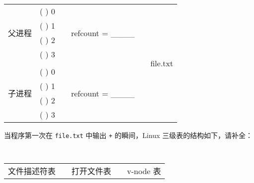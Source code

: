 \begin{problems}
\begin{table}[H]
\begin{tabular}{cccccc}
                \multicolumn{1}{|c|}{\multirow{4}{*}{父进程}} & \multicolumn{1}{c|}{(     ) 0} & \multicolumn{1}{c|}{} & \multicolumn{1}{c|}{\multirow{4}{*}{refcount = \_\_\_\_}} & \multicolumn{1}{c|}{} & \multicolumn{1}{c|}{\multirow{9}{*}{file.txt}} \\ \cline{2-2}
                \multicolumn{1}{|c|}{} & \multicolumn{1}{c|}{(     ) 1} & \multicolumn{1}{c|}{} & \multicolumn{1}{c|}{} & \multicolumn{1}{c|}{} & \multicolumn{1}{c|}{} \\ \cline{2-2}
                \multicolumn{1}{|c|}{} & \multicolumn{1}{c|}{(     ) 2} & \multicolumn{1}{c|}{} & \multicolumn{1}{c|}{} & \multicolumn{1}{c|}{} & \multicolumn{1}{c|}{} \\ \cline{2-2}
                \multicolumn{1}{|c|}{} & \multicolumn{1}{c|}{(     ) 3} & \multicolumn{1}{c|}{} & \multicolumn{1}{c|}{} & \multicolumn{1}{c|}{} & \multicolumn{1}{c|}{} \\ \cline{1-2} \cline{4-4}
                &  &  &  & \multicolumn{1}{c|}{} & \multicolumn{1}{c|}{} \\ \cline{1-2} \cline{4-4}
                \multicolumn{1}{|c|}{\multirow{4}{*}{子进程}} & \multicolumn{1}{c|}{(     ) 0} & \multicolumn{1}{c|}{} & \multicolumn{1}{c|}{\multirow{4}{*}{refcount = \_\_\_\_}} & \multicolumn{1}{c|}{} & \multicolumn{1}{c|}{} \\ \cline{2-2}
                \multicolumn{1}{|c|}{} & \multicolumn{1}{c|}{(     ) 1} & \multicolumn{1}{c|}{} & \multicolumn{1}{c|}{} & \multicolumn{1}{c|}{} & \multicolumn{1}{c|}{} \\ \cline{2-2}
                \multicolumn{1}{|c|}{} & \multicolumn{1}{c|}{(     ) 2} & \multicolumn{1}{c|}{} & \multicolumn{1}{c|}{} & \multicolumn{1}{c|}{} & \multicolumn{1}{c|}{} \\ \cline{2-2}
                \multicolumn{1}{|c|}{} & \multicolumn{1}{c|}{(     ) 3} & \multicolumn{1}{c|}{} & \multicolumn{1}{c|}{} & \multicolumn{1}{c|}{} & \multicolumn{1}{c|}{} \\ \cline{1-2} \cline{4-4} \cline{6-6} 
            \end{tabular}
        \end{table}
        \subqn 当程序第一次在 \verb|file.txt| 中输出 \verb|+| 的瞬间，Linux 三级表的结构如下，请补全：
        \begin{table}[H]
            \tt
            \centering
            \begin{tabular}{cccccc}
                \multicolumn{2}{c}{文件描述符表} & {\qquad} & 打开文件表 & {\qquad} & v-node 表 \\ \cline{1-2} \cline{4-4} \cline{6-6} 

\end{tabular}
\end{table}
\end{problems}

